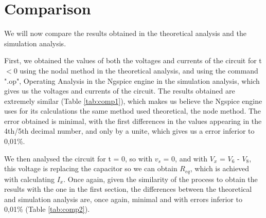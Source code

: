\newpage
\section{Comparison}
\label{sec:comparison}
\par
We will now compare the results obtained in the theoretical analysis and the simulation analysis.\par
\par

First, we obtained the values of both the voltages and currents of the circuit for t$<$0 using the nodal method in the theoretical analysis, and using the command ".op", Operating Analysis in the Ngspice engine in the simulation analysis, which gives us the voltages and currents of the circuit. The results obtained are extremely similar (Table \ref{tab:comp1}), which makes us believe the Ngspice engine uses for its calculations the same method used theoretical, the node method. The error obtained is minimal, with the first differences in the values appearing in the 4th/5th decimal number, and only by a unite, which gives us a error inferior to 0,01\%.

%       
%      


We then analysed the circuit for t = 0, so with $v_s$ = 0, and with $V_x$ = $V_6$ - $V_8$, this voltage is replacing the capacitor so we can obtain $R_{eq}$, which is achieved with calculating $I_x$. Once again, given the similarity of the process to obtain the results with the one in the first section, the differences between the theoretical and simulation analysis are, once again, minimal and with errors inferior to 0,01\% (Table \ref{tab:comp2}).



